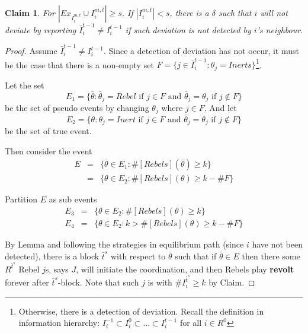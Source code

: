 \documentclass[12pt]{article}
\newtheorem{claim}{Claim}[subsubsection]
\theoremstyle{remark}
\theoremstyle{remark}
\begin{document}
\begin{claim} 
\label{claim_deviation_higher_reporting}
For $|Ex_{I^{m,t}_i}\cup I^{m,t}_i|\geq s$. If $|I^{m,t}_i|<s$, there is a $\delta$ such that $i$ will not deviate by reporting $\bar{I}^{t-1}_i\neq I^{t-1}_i$ if such deviation is not detected by $i$'s neighbour.
\end{claim}

\begin{proof}
Assume $\bar{I}^{t-1}_i\neq I^{t-1}_i$. Since a detection of deviation has not occur, it must be the case that there is a non-empty set $F=\{j\in \bar{I}^{t-1}_i:\theta_j=Inerts\}$\footnote{Otherwise, there is a detection of deviation. Recall the definition in information hierarchy: $I^{-1}_i\subset I^{0}_i\subset...\subset I^{t-1}_i$ for all $i\in R^0$}. 


Let the set 
\[E_1=\{\bar{\theta}: \bar{\theta}_j=Rebel \text{ if } j\in F \text { and }\bar{\theta}_j=\theta_j \text{ if } j\notin F\}\]
be the set of pseudo events by changing $\theta_j$ where $j\in F$. And let
\[E_2=\{\theta: \theta_j=Inert \text{ if }j\in F \text { and }\bar{\theta}_j=\theta_j \text{ if } j\notin F\}\]
be the set of true event.

Then consider the event
\begin{eqnarray*}
E 	&= &\{\bar{\theta}\in E_1: \#[Rebels](\bar{\theta})\geq k\}\\
 	&= &\{\theta\in E_2: \#[Rebels](\theta)\geq k-\#F\}
\end{eqnarray*}

Partition $E$ as sub events
\begin{eqnarray*}
E_3 	&= &\{\theta\in E_2: \#[Rebels](\theta)\geq k\}\\
E_4 	&= &\{\theta\in E_2: k>\#[Rebels](\theta)\geq k-\#F\}
\end{eqnarray*}

By Lemma and following the strategies in equilibrium path (since $i$ have not been detected), there is a block $\bar{t}^{s}$ with respect to $\bar{\theta}$ such that if $\bar{\theta}\in E$ then there some $R^{\bar{t}^s}$ Rebel $j$s, says $J$, will initiate the coordination, and then Rebels play \textbf{revolt} forever after $\bar{t}^s$-block. Note that such $j$ is with $\# {I}^{\bar{t}^{s}}_i \geq k$ by Claim.


\end{proof}
\end{document}

